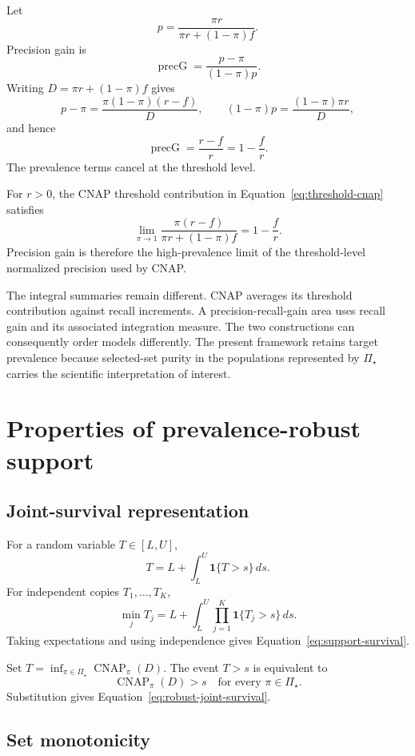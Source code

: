 \documentclass[11pt]{article}
\newcommand{\CNAP}{\operatorname{CNAP}}
\newcommand{\PSet}{\Pi_\star}
\theoremstyle{remark}
\begin{document}
Let
\[
p
=
\frac{\pi r}{\pi r+(1-\pi)f}.
\]
Precision gain is
\[
\operatorname{precG}
=
\frac{p-\pi}{(1-\pi)p}.
\]
Writing $D=\pi r+(1-\pi)f$ gives
\[
p-\pi
=
\frac{\pi(1-\pi)(r-f)}{D},
\qquad
(1-\pi)p
=
\frac{(1-\pi)\pi r}{D},
\]
and hence
\begin{equation}
\operatorname{precG}
=
\frac{r-f}{r}
=
1-\frac{f}{r}.
\label{eq:precision-gain}
\end{equation}
The prevalence terms cancel at the threshold level.

For $r>0$, the CNAP threshold contribution in Equation~\eqref{eq:threshold-cnap} satisfies
\begin{equation}
\lim_{\pi\to1}
\frac{\pi(r-f)}
{\pi r+(1-\pi)f}
=
1-\frac{f}{r}.
\label{eq:precision-gain-limit}
\end{equation}
Precision gain is therefore the high-prevalence limit of the threshold-level normalized precision used by CNAP.

The integral summaries remain different. CNAP averages its threshold contribution against recall increments. A precision-recall-gain area uses recall gain and its associated integration measure. The two constructions can consequently order models differently. The present framework retains target prevalence because selected-set purity in the populations represented by $\PSet$ carries the scientific interpretation of interest.

\section{Properties of prevalence-robust support}
\label{app:proofs}

\subsection{Joint-survival representation}

For a random variable $T\in[L,U]$,
\[
T
=
L+\int_L^U\mathbf{1}\{T>s\}\,ds.
\]
For independent copies $T_1,\ldots,T_K$,
\[
\min_jT_j
=
L+
\int_L^U
\prod_{j=1}^{K}
\mathbf{1}\{T_j>s\}\,ds.
\]
Taking expectations and using independence gives Equation~\eqref{eq:support-survival}.

Set $T=\inf_{\pi\in\PSet}\CNAP_\pi(D)$. The event $T>s$ is equivalent to
\[
\CNAP_\pi(D)>s
\quad
\text{for every }\pi\in\PSet.
\]
Substitution gives Equation~\eqref{eq:robust-joint-survival}.

\subsection{Set monotonicity}
\end{document}

